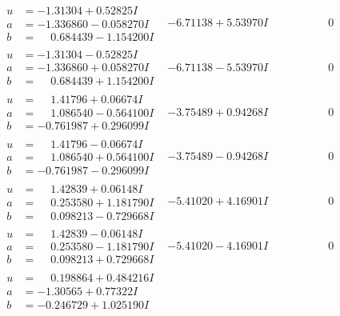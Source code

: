 \documentclass[1p]{elsarticle_modified}
\theoremstyle{definition}
\begin{document}
$$\begin{array}{c|c|c}
\begin{aligned}
u &= -1.31304 + 0.52825 I \\
a &= -1.336860 - 0.058270 I \\
b &= \phantom{-}0.684439 - 1.154200 I\end{aligned}
 & -6.71138 + 5.53970 I & \phantom{-0.000000 } 0 \\ \hline\begin{aligned}
u &= -1.31304 - 0.52825 I \\
a &= -1.336860 + 0.058270 I \\
b &= \phantom{-}0.684439 + 1.154200 I\end{aligned}
 & -6.71138 - 5.53970 I & \phantom{-0.000000 } 0 \\ \hline\begin{aligned}
u &= \phantom{-}1.41796 + 0.06674 I \\
a &= \phantom{-}1.086540 - 0.564100 I \\
b &= -0.761987 + 0.296099 I\end{aligned}
 & -3.75489 + 0.94268 I & \phantom{-0.000000 } 0 \\ \hline\begin{aligned}
u &= \phantom{-}1.41796 - 0.06674 I \\
a &= \phantom{-}1.086540 + 0.564100 I \\
b &= -0.761987 - 0.296099 I\end{aligned}
 & -3.75489 - 0.94268 I & \phantom{-0.000000 } 0 \\ \hline\begin{aligned}
u &= \phantom{-}1.42839 + 0.06148 I \\
a &= \phantom{-}0.253580 + 1.181790 I \\
b &= \phantom{-}0.098213 - 0.729668 I\end{aligned}
 & -5.41020 + 4.16901 I & \phantom{-0.000000 } 0 \\ \hline\begin{aligned}
u &= \phantom{-}1.42839 - 0.06148 I \\
a &= \phantom{-}0.253580 - 1.181790 I \\
b &= \phantom{-}0.098213 + 0.729668 I\end{aligned}
 & -5.41020 - 4.16901 I & \phantom{-0.000000 } 0 \\ \hline\begin{aligned}
u &= \phantom{-}0.198864 + 0.484216 I \\
a &= -1.30565 + 0.77322 I \\
b &= -0.246729 + 1.025190 I\end{aligned}

\end{array}$$
\end{document}
